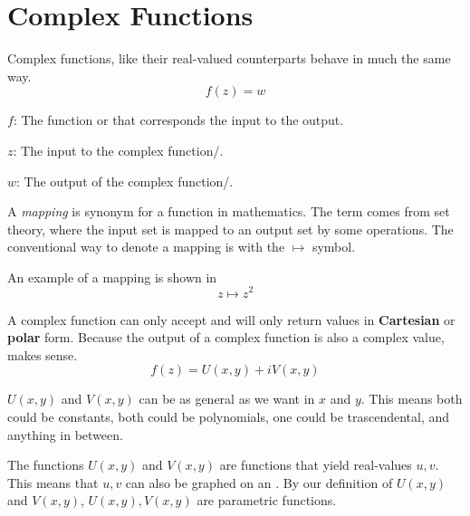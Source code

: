 \section{Complex Functions}\label{sec:Complex_Functions}
Complex functions, like their real-valued counterparts behave in much the same way.
\begin{equation}\label{eq:Complex_Function}
  f(z) = w
\end{equation}
\begin{description}[noitemsep]
\item $f$: The function or  that corresponds the input to the output.
\item $z$: The input to the complex function/.
\item $w$: The output of the complex function/.
\end{description}

\begin{definition}[Mapping]\label{def:Mapping}
  A \emph{mapping} is synonym for a function in mathematics.
  The term comes from set theory, where the input set is mapped to an output set by some operations.
  The conventional way to denote a mapping is with the $\mapsto$ symbol.

  An example of a mapping is shown in 
  \begin{equation}\label{eq:Mapping}
    z \mapsto z^{2}
  \end{equation}
\end{definition}

A complex function can only accept and will only return values in \textbf{Cartesian} or \textbf{polar} form.
Because the output of a complex function is also a complex value,  makes sense.
\begin{equation}\label{eq:Output_Value_Function}
  f(z) = U(x, y) + iV(x, y)
\end{equation}

$U(x, y)$ and $V(x, y)$ can be as general as we want in $x$ and $y$.
This means both could be constants, both could be polynomials, one could be trascendental, and anything in between.

The functions $U(x, y)$ and $V(x, y)$ are functions that yield real-values $u, v$.
This means that $u, v$ can also be graphed on an .
By our definition of $U(x, y)$ and $V(x, y)$, $U(x, y), V(x, y)$ are parametric functions.

